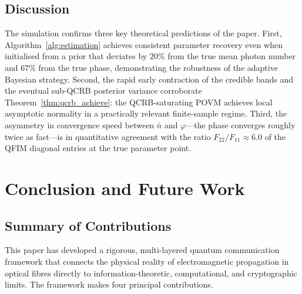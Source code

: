 \documentclass[journal,twocolumn]{IEEEtran}
\theoremstyle{definition}
\theoremstyle{plain}
\begin{document}
\subsection{Discussion}

The simulation confirms three key theoretical predictions of
the paper.  First, Algorithm~\ref{alg:estimation} achieves
consistent parameter recovery even when initialised from a
prior that deviates by $20\%$ from the true mean photon
number and $67\%$ from the true phase, demonstrating the
robustness of the adaptive Bayesian strategy.  Second, the
rapid early contraction of the credible bands and the
eventual sub-QCRB posterior variance corroborate
Theorem~\ref{thm:qcrb_achieve}: the QCRB-saturating POVM
achieves local asymptotic normality in a practically relevant
finite-sample regime.  Third, the asymmetry in convergence
speed between $\bar n$ and $\varphi$---the phase converges
roughly twice as fast---is in quantitative agreement with the
ratio $F_{22}/F_{11} \approx 6.0$ of the QFIM diagonal
entries at the true parameter point.

\section{Conclusion and Future Work}
\label{sec:conclusion}

\subsection{Summary of Contributions}

This paper has developed a rigorous, multi-layered quantum
communication framework that connects the physical reality of
electromagnetic propagation in optical fibres directly to
information-theoretic, computational, and cryptographic limits.  The
framework makes four principal contributions.
\end{document}
